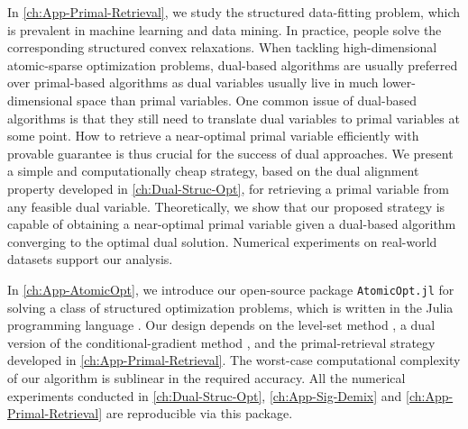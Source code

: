 In \autoref{ch:App-Primal-Retrieval}, we study the structured data-fitting problem, which is prevalent in machine learning and data mining. In practice, people solve the corresponding structured convex relaxations. When tackling high-dimensional atomic-sparse optimization problems, dual-based algorithms are usually preferred over primal-based algorithms as dual variables usually live in much lower-dimensional space than primal variables. One common issue of dual-based algorithms is that they still need to translate dual variables to primal variables at some point. How to retrieve a near-optimal primal variable efficiently with provable guarantee is thus crucial for the success of dual approaches. We present a simple and computationally cheap strategy, based on the dual alignment property developed in \autoref{ch:Dual-Struc-Opt}, for retrieving a primal variable from any feasible dual variable. Theoretically, we show that our proposed strategy is capable of obtaining a near-optimal primal variable given a dual-based algorithm converging to the optimal dual solution. Numerical experiments on real-world datasets support our analysis.

In \autoref{ch:App-AtomicOpt}, we introduce our open-source package \texttt{AtomicOpt.jl} for solving a class of structured optimization problems, which is written in the Julia programming language \citep{bezanson2017julia}. Our design depends on the level-set method \citep{aravkin2016levelset}, a dual version of the conditional-gradient method \cite{jaggi2013revisiting,frank1956algorithm,dunn1978conditional}, and the primal-retrieval strategy developed in \autoref{ch:App-Primal-Retrieval}. The worst-case computational complexity of our algorithm is sublinear in the required accuracy. All the numerical experiments conducted in \autoref{ch:Dual-Struc-Opt}, \autoref{ch:App-Sig-Demix} and \autoref{ch:App-Primal-Retrieval} are reproducible via this package. 



 

